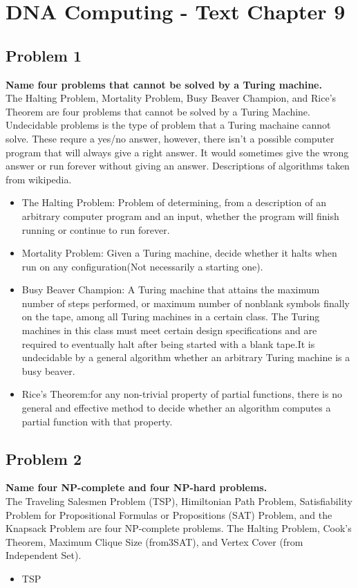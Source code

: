 
\chapter{DNA Computing - Text Chapter 9}


\section{ Problem 1 }
\textbf{ Name four problems that cannot be solved by a Turing machine. } \\
The Halting Problem, Mortality Problem, Busy Beaver Champion, and Rice's Theorem are four problems that cannot be solved by a Turing Machine. Undecidable problems is the type of problem that a Turing machaine cannot solve. These requre a yes/no answer, however, there isn't a possible computer program that will always give a right answer. It would sometimes give the wrong answer or run forever without giving an answer. Descriptions of algorithms taken from wikipedia.
\begin{itemize}
	\item The Halting Problem: Problem of determining, from a description of an arbitrary computer program and an input, whether the program will finish running or continue to run forever.
	\item Mortality Problem: Given a Turing machine, decide whether it halts when run on any configuration(Not necessarily a starting one).
	\item Busy Beaver Champion: A Turing machine that attains the maximum number of steps performed, or maximum number of nonblank symbols finally on the tape, among all Turing machines in a certain class. The Turing machines in this class must meet certain design specifications and are required to eventually halt after being started with a blank tape.It is undecidable by a general algorithm whether an arbitrary Turing machine is a busy beaver.
	\item Rice's Theorem:for any non-trivial property of partial functions, there is no general and effective method to decide whether an algorithm computes a partial function with that property.
\end{itemize}

\section{ Problem 2 }
\textbf{ Name four NP-complete and four NP-hard problems. } \\
The Traveling Salesmen Problem (TSP), Himiltonian Path Problem, Satisfiability Problem for Propositional Formulas or Propositions (SAT) Problem, and the Knapsack Problem are four NP-complete problems. The Halting Problem, Cook's Theorem, Maximum Clique Size (from3SAT), and Vertex Cover (from Independent Set).
\begin{itemize}
	\item TSP
\end{itemize}

